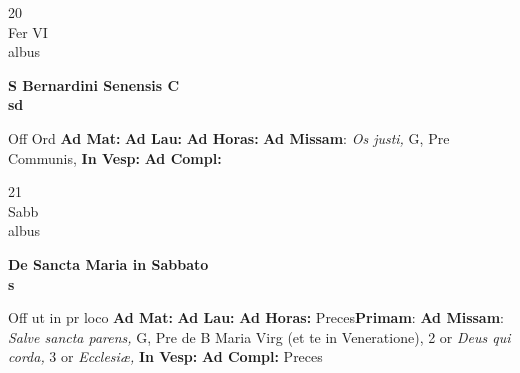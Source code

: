 \documentclass[10pt, openany]{book}
\begin{document}
        \begin{center}
            \begin{minipage}{3.5in}
                \vspace{2em}
                \begin{minipage}{0.5in}
                    {\Huge 20} \\
                    {\normalsize Fer VI} \\
                    {\normalsize albus}
                \end{minipage}
                \begin{minipage}{3.0in}
                    \textbf{ \large S Bernardini Senensis C \\
                    \textnormal{\normalsize sd}} \\ 
                \end{minipage}
                \begin{justify}Off Ord
                    \textbf{Ad Mat: }
                    \textbf{Ad Lau: }
                    \textbf{Ad Horas: }\textbf{Ad Missam}: \textit{Os justi,} G, Pre Communis,  
                    \textbf{In Vesp: }
                    \textbf{Ad Compl: }
                \end{justify}
            \end{minipage}
        \end{center}
    
        \begin{center}
            \begin{minipage}{3.5in}
                \vspace{2em}
                \begin{minipage}{0.5in}
                    {\Huge 21} \\
                    {\normalsize Sabb} \\
                    {\normalsize albus}
                \end{minipage}
                \begin{minipage}{3.0in}
                    \textbf{ \large De Sancta Maria in Sabbato \\
                    \textnormal{\normalsize s}} \\ 
                \end{minipage}
                \begin{justify}Off ut in pr loco
                    \textbf{Ad Mat: }
                    \textbf{Ad Lau: }
                    \textbf{Ad Horas: }Preces\textbf{Primam}: \textbf{Ad Missam}: \textit{Salve sancta parens,} G, Pre de B Maria Virg (et te in Veneratione), 2 or \textit{Deus qui corda,} 3 or \textit{Ecclesiæ,}  
                    \textbf{In Vesp: }
                    \textbf{Ad Compl: }Preces
                \end{justify}
            \end{minipage}
        \end{center}
    
\end{document}

